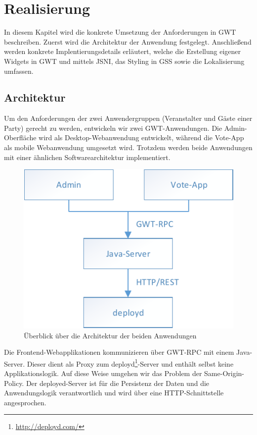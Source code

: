 \section{Realisierung}

In diesem Kapitel wird die konkrete Umsetzung der Anforderungen in GWT beschreiben.
Zuerst wird die Architektur der Anwendung festgelegt. Anschließend werden konkrete
Implentierungsdetails erläutert, welche die Erstellung eigener Widgets in GWT und
mittels JSNI, das Styling in GSS sowie die Lokalisierung umfassen.

\subsection{Architektur}

Um den Anforderungen der zwei Anwendergruppen (Veranstalter und Gäste einer Party) gerecht
zu werden, entwickeln wir zwei GWT-Anwendungen. Die Admin-Oberfläche wird als Desktop-Webanwendung
entwickelt, während die Vote-App als mobile Webanwendung umgesetzt wird. Trotzdem werden
beide Anwendungen mit einer ähnlichen Softwarearchitektur implementiert.

\begin{figure}[tbh]
\centering
\includegraphics[width=0.7\linewidth]{Bilder/Architektur-Ueberblick}
\caption{Überblick über die Architektur der beiden Anwendungen}
\label{fig:Architektur-Ueberblick}
\end{figure}

Die Frontend-Webapplikationen kommunizieren über GWT-RPC mit einem Java-Server. Dieser dient als 
Proxy zum deployd\footnote{\url{http://deployd.com/}}-Server und enthält selbst keine Applikationslogik. Auf diese Weise umgehen wir das Problem der Same-Origin-Policy. Der deployed-Server
ist für die Persistenz der Daten und die Anwendungslogik verantwortlich und wird über eine
HTTP-Schnittstelle angesprochen.

